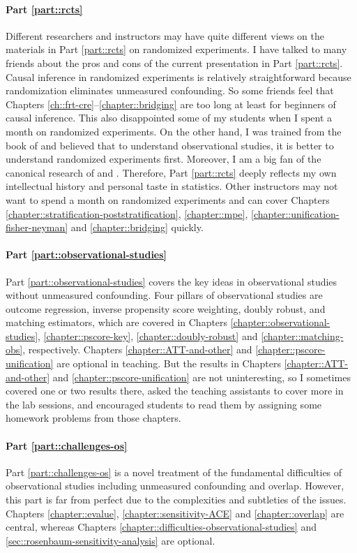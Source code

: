 \paragraph*{Part \ref{part::rcts}}
Different researchers and instructors may have quite different views on the materials in Part \ref{part::rcts} on randomized experiments.  I have talked to many friends about the pros and cons of the current presentation in Part \ref{part::rcts}.  Causal inference in randomized experiments is relatively straightforward because randomization eliminates unmeasured confounding. So some friends feel that Chapters \ref{ch::frt-cre}--\ref{chapter::bridging} are too long at least for beginners of causal inference.  This also disappointed some of my students when I spent a month on randomized experiments. 
On the other hand,  I was trained from the book of \citet{imbens2015causal} and believed that to understand observational studies, it is better to understand randomized experiments first. Moreover, I am a big fan of the canonical research of \citet{Neyman:1923} and \citet{Fisher:1935}.  Therefore, Part \ref{part::rcts} deeply reflects my own intellectual history and personal taste in statistics. Other instructors may not want to spend a month on randomized experiments and can cover Chapters \ref{chapter::stratification-poststratification}, \ref{chapter::mpe}, \ref{chapter::unification-fisher-neyman} and \ref{chapter::bridging} quickly.


\paragraph*{Part \ref{part::observational-studies}}
Part \ref{part::observational-studies} covers the key ideas in observational studies without unmeasured confounding.  Four pillars of observational studies are outcome regression, inverse propensity score weighting, doubly robust, and matching estimators, which are covered in Chapters \ref{chapter::observational-studies}, \ref{chapter::pscore-key}, \ref{chapter::doubly-robust} and \ref{chapter::matching-obs}, respectively. 
Chapters \ref{chapter::ATT-and-other} and \ref{chapter::pscore-unification} are optional in teaching. But the results in Chapters \ref{chapter::ATT-and-other} and \ref{chapter::pscore-unification} are not uninteresting, so I sometimes covered one or two results there, asked the teaching assistants to cover more in the lab sessions, and encouraged students to read them by assigning some homework problems from those chapters. 


\paragraph*{Part \ref{part::challenges-os}}
Part \ref{part::challenges-os} is a novel treatment of the fundamental difficulties of observational studies including unmeasured confounding and overlap. However,  this part is far from perfect due to the complexities and subtleties of the issues.  Chapters \ref{chapter::evalue}, \ref{chapter::sensitivity-ACE} and \ref{chapter::overlap} are central, whereas Chapters \ref{chapter::difficulties-observational-studies} and \ref{sec::rosenbaum-sensitivity-analysis} are optional. 


